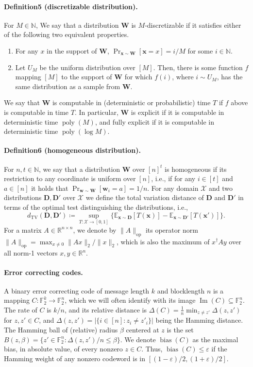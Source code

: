 \documentclass[10pt,a4paper]{article}
\DeclareMathOperator{\bias}{bias}
\begin{document}
\paragraph{Definition5 (discretizable distribution).} For $M\in\mathbb N$, We say that a distribution $\mathbf W$ is $M$-discretizable if it satisfies either of the following two equivalent properties.
\begin{enumerate}
\item For any $x$ in the support of $\mathbf W$, $\Pr_{\mathbf x\sim\mathbf W}[\mathbf x=x]=i/M$ for some $i\in\mathbb N$.
\item Let $U_M$ be the uniform distribution over $[M]$. Then, there is some function $f$ mapping $[M]$ to the support of $\mathbf W$ for which $f(i)$, where $i\sim U_M$, has the same distribution as a sample from $\mathbf W$.
\end{enumerate}
We say that $\mathbf W$ is computable in (deterministic or probabilistic) time $T$ if $f$ above is computable in time $T$. In particular, $\mathbf W$ is explicit if it is computable in deterministic time $\operatorname{poly}(M)$, and fully explicit if it is computable in deterministic time $\operatorname{poly}(\log M)$.
\paragraph{Definition6 (homogeneous distribution).} For $n,t\in\mathbb N$, we say that a distribution $\mathbf W$ over $[n]^t$ is homogeneous if its restriction to any coordinate is uniform over $[n]$, i.e., if for any $i\in[t]$ and $a\in[n]$ it holds that $\Pr_{\mathbf w\sim\mathbf W}[\mathbf w_i=a]=1/n$.
For any domain $\mathcal X$ and two distributions $\mathbf D,\mathbf D'$ over $\mathcal X$ we define the total variation distance of $\mathbf D$ and $\mathbf D'$ in terms of the optimal test distinguishing the distributions, i.e.,
\[d_{\mathrm{TV}}(\mathbf D,\mathbf D')\coloneqq\sup_{T:\mathcal X\to[0,1]}\{\mathbb E_{\mathbf x\sim\mathbf D}[T(\mathbf x)]-\mathbb E_{\mathbf x\sim\mathbf D'}[T(\mathbf x')]\}.\]
For a matrix $A\in\mathbb R^{n\times n}$, we denote by $\|A\|_{\mathrm{op}}$ its operator norm $\|A\|_{\mathrm{op}}=\max_{x\neq0}\|Ax\|_2/\|x\|_2$, which is also the maximum of $x^{\dagger}Ay$ over all norm-1 vectors $x,y\in\mathbb R^n$.
\paragraph{Error correcting codes.}
A binary error correcting code of message length $k$ and blocklength $n$ is a mapping $C:\mathbb F_2^k\to\mathbb F_2^n$, which we will often identify with its image $\operatorname{Im}(C)\subseteq\mathbb F_2^n$. The rate of $C$ is $k/n$, and its relative distance is $\Delta(C)=\frac1n\min_{z\neq z'}\Delta(z,z')$ for $z,z'\in C$, and $\Delta(z,z')=|\{i\in[n]:z_i\neq z'_i\}|$ being the Hamming distance. The Hamming ball of (relative) radius $\beta$ centered at $z$ is the set $B(z,\beta)=\{z'\in\mathbb F_2^n:\Delta(z,z')/n\leq\beta\}$.
We denote $\bias(C)$ as the maximal bias, in absolute value, of every nonzero $z\in C$. Thus, $\bias(C)\leq\varepsilon$ if the Hamming weight of any nonzero codeword is in $[(1-\varepsilon)/2,(1+\varepsilon)/2]$.
\end{document}
